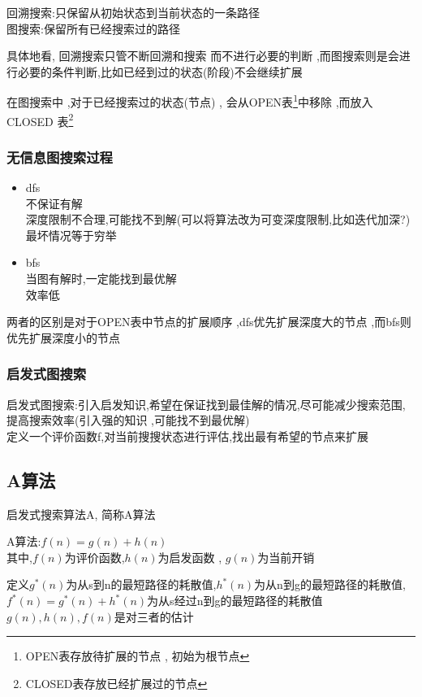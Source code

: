 \documentclass[UTF8,a4paper]{ctexart}
\begin{document}
回溯搜索:只保留从初始状态到当前状态的一条路径\\
图搜索:保留所有已经搜索过的路径

具体地看, 回溯搜索只管不断回溯和搜索 而不进行必要的判断 ,而图搜索则是会进行必要的条件判断,比如已经到过的状态(阶段)不会继续扩展

在图搜索中 ,对于已经搜索过的状态(节点) , 会从OPEN表\footnote{OPEN表存放待扩展的节点 , 初始为根节点}中移除 ,而放入 CLOSED 表\footnote{CLOSED表存放已经扩展过的节点}

\subsubsection{无信息图搜索过程}
\begin{itemize}
	\item dfs\\
	      不保证有解\\
	      深度限制不合理,可能找不到解(可以将算法改为可变深度限制,比如迭代加深?)\\
	      最坏情况等于穷举\\
	\item bfs\\
	      当图有解时,一定能找到最优解\\
	      效率低
\end{itemize}
两者的区别是对于OPEN表中节点的扩展顺序 ,dfs优先扩展深度大的节点 ,而bfs则优先扩展深度小的节点

\subsubsection{启发式图搜索}
启发式图搜索:引入启发知识,希望在保证找到最佳解的情况,尽可能减少搜索范围,提高搜索效率(引入强的知识 ,可能找不到最优解)\\

定义一个评价函数f,对当前搜搜状态进行评估,找出最有希望的节点来扩展

\subsection{A算法}
启发式搜索算法A, 简称A算法

A算法:$f(n) = g(n) + h(n)$\\
其中,$f(n)$为评价函数,$h(n)$为启发函数 , $g(n)$为当前开销

定义$g^*(n)$为从s到n的最短路径的耗散值,$h^*(n)$为从n到g的最短路径的耗散值,$f^*(n) = g^*(n) + h^*(n)$为从s经过n到g的最短路径的耗散值\\
$g(n) , h(n) , f(n)$是对三者的估计
\end{document}
